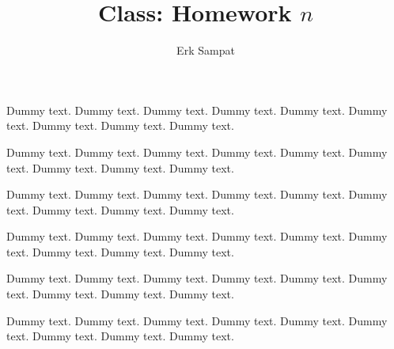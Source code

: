 \title{{\selectfont Class: } Homework $n$}
\author{Erk Sampat}



\maketitle
\prob
Dummy text. Dummy text. Dummy text. Dummy text. Dummy text. Dummy text. Dummy text. Dummy text. Dummy text.

Dummy text. Dummy text. Dummy text. Dummy text. Dummy text. Dummy text. Dummy text. Dummy text. Dummy text.
\begin{pp}
	Dummy text. Dummy text. Dummy text. Dummy text. Dummy text. Dummy text. Dummy text. Dummy text. Dummy text.
	
	Dummy text. Dummy text. Dummy text. Dummy text. Dummy text. Dummy text. Dummy text. Dummy text. Dummy text.
	\begin{spart}
		Dummy text. Dummy text. Dummy text. Dummy text. Dummy text. Dummy text. Dummy text. Dummy text. Dummy text.
		
		Dummy text. Dummy text. Dummy text. Dummy text. Dummy text. Dummy text. Dummy text. Dummy text. Dummy text.
	\end{spart}
\end{pp}

